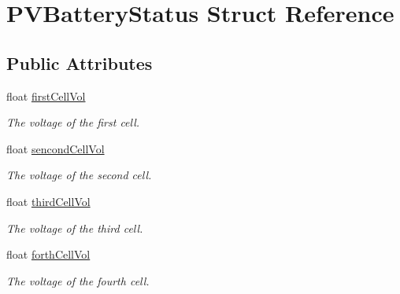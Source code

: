 \hypertarget{struct_p_v_battery_status}{}\section{P\+V\+Battery\+Status Struct Reference}
\label{struct_p_v_battery_status}
\subsection*{Public Attributes}
\begin{DoxyCompactItemize}
\item 
\mbox{\label{struct_p_v_battery_status_a96dec10be566c1bc1c7271aa72636451}} 
float \hyperlink{struct_p_v_battery_status_a96dec10be566c1bc1c7271aa72636451}{first\+Cell\+Vol}
\begin{DoxyCompactList}\small\item\em The voltage of the first cell. \end{DoxyCompactList}\item 
\mbox{\label{struct_p_v_battery_status_ab240c8f6ef15e3874306b89a010ae77e}} 
float \hyperlink{struct_p_v_battery_status_ab240c8f6ef15e3874306b89a010ae77e}{sencond\+Cell\+Vol}
\begin{DoxyCompactList}\small\item\em The voltage of the second cell. \end{DoxyCompactList}\item 
\mbox{\label{struct_p_v_battery_status_ad7a64175d8f011d629d218d22f207a27}} 
float \hyperlink{struct_p_v_battery_status_ad7a64175d8f011d629d218d22f207a27}{third\+Cell\+Vol}
\begin{DoxyCompactList}\small\item\em The voltage of the third cell. \end{DoxyCompactList}\item 
\mbox{\label{struct_p_v_battery_status_a9391f787053cb237a8f545e6b5d3875e}} 
float \hyperlink{struct_p_v_battery_status_a9391f787053cb237a8f545e6b5d3875e}{forth\+Cell\+Vol}
\begin{DoxyCompactList}\small\item\em The voltage of the fourth cell. \end{DoxyCompactList}\item 

\end{DoxyCompactItemize}
